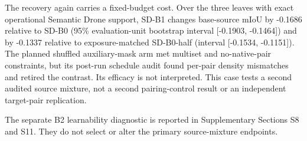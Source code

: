 The recovery again carries a fixed-budget cost. Over the three leaves with exact operational Semantic Drone support, SD-B1 changes base-source mIoU by -0.1686 relative to SD-B0 (95\% evaluation-unit bootstrap interval [-0.1903, -0.1464]) and by -0.1337 relative to exposure-matched SD-B0-half (interval [-0.1534, -0.1151]). The planned shuffled auxiliary-mask arm met multiset and no-native-pair constraints, but its post-run schedule audit found per-pair density mismatches and retired the contrast. Its efficacy is not interpreted. This case tests a second audited source mixture, not a second pairing-control result or an independent target-pair replication.



The separate B2 learnability diagnostic is reported in Supplementary Sections S8 and S11. They do not select or alter the primary source-mixture endpoints.
